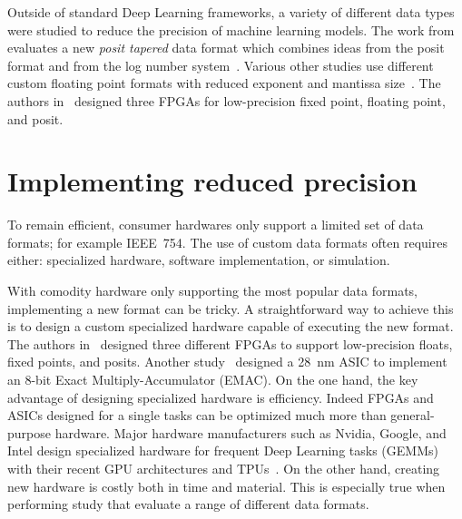 Outside of standard Deep Learning frameworks, a variety of different data types were
studied to reduce the precision of machine learning models.
The work from~\cite{Johnson2018-up} evaluates a new \textit{posit tapered} data 
format which combines ideas from the posit~\cite{Gustafson2017-wo} format and from the log number system~\cite{Kingsbury1971-kx}.
Various other studies use different custom floating point formats with reduced 
exponent and mantissa size~\cite{Lesser2011-mn, Chen2018-an, Vicuna2021-mw, Wang2018-oo}.
The authors in~\cite{Carmichael2019-nu} designed three FPGAs for low-precision fixed
point, floating point, and posit.

\section{Implementing reduced precision}
To remain efficient, consumer hardwares only support a limited set of data formats; for example IEEE~754.
The use of custom data formats often requires either: specialized hardware, software implementation, or simulation.

With comodity hardware only supporting the most popular data formats, implementing a new format can be tricky.
A straightforward way to achieve this is to design a custom specialized hardware capable of executing the new format.
The authors in~\cite{Carmichael2019-nu} designed three different FPGAs to support low-precision floats, fixed points, and posits.
Another study~\cite{Johnson2018-up} designed a \SI{28}{\nano\meter} ASIC to implement an 8-bit Exact Multiply-Accumulator (EMAC).
On the one hand, the key advantage of designing specialized hardware is efficiency.
Indeed FPGAs and ASICs designed for a single tasks can be optimized much more than general-purpose hardware.
Major hardware manufacturers such as Nvidia, Google, and Intel design specialized hardware
for frequent Deep Learning tasks (GEMMs) with their recent GPU architectures and TPUs~\cite{tpu,intel-BF16-2018}.
On the other hand, creating new hardware is costly both in time and material.
This is especially true when performing study that evaluate a range of different data formats.

